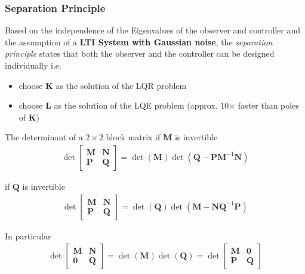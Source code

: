 \subsubsection{Separation Principle}

Based on the independence of the Eigenvalues of the observer and controller and the assumption of a \textbf{LTI System with Gaussian noise}, the \textit{separation principle} states that
both the observer and the controller can be designed individually i.e.\
\begin{itemize}
    \item choose $\mathbf{K}$ as the solution of the LQR problem
    \item choose $\mathbf{L}$ as the solution of the LQE problem \newline(approx. 10$\times$ faster than poles of $\mathbf{K}$)
\end{itemize}

\newpar{}

The determinant of a $2\times2$ block matrix
if $\mathbf{M}$ is invertible
\begin{align*}
    \det\begin{bmatrix}
            \mathbf{M} & \mathbf{N} \\
            \mathbf{P} & \mathbf{Q}
        \end{bmatrix}
    = \det(\mathbf{M})\det(\mathbf{Q}-\mathbf{PM}^{-1}\mathbf{N})
\end{align*}

if $\mathbf{Q}$ is invertible
\begin{align*}
    \det\begin{bmatrix}
            \mathbf{M} & \mathbf{N} \\
            \mathbf{P} & \mathbf{Q}
        \end{bmatrix}
    = \det(\mathbf{Q})\det(\mathbf{M}-\mathbf{NQ}^{-1}\mathbf{P})
\end{align*}

In particular
\begin{align*}
    \det\begin{bmatrix}
            \mathbf{M} & \mathbf{N} \\
            \mathbf{0} & \mathbf{Q}
        \end{bmatrix}
    = \det(\mathbf{M})\det(\mathbf{Q}) =
    \det\begin{bmatrix}
            \mathbf{M} & \mathbf{0} \\
            \mathbf{P} & \mathbf{Q}
        \end{bmatrix}
\end{align*}

